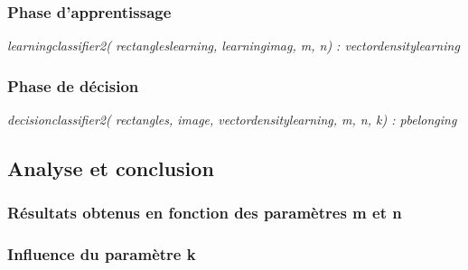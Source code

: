 \subsubsection{Phase d'apprentissage}

\textit{learningclassifier2( rectangleslearning, learningimag, m, n) : vectordensitylearning}


\subsubsection{Phase de décision}

\textit{decisionclassifier2( rectangles, image, vectordensitylearning, m, n, k) : pbelonging}


\subsection{Analyse et conclusion}

\subsubsection{Résultats obtenus en fonction des paramètres m et n}

\subsubsection{Influence du paramètre k}